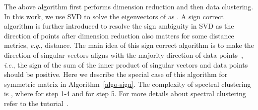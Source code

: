 \documentclass[sigconf]{acmart}
\newcommand{\ie}{\textit{i}.\textit{e}.}
\newcommand{\eg}{\textit{e}.\textit{g}.}
\begin{document}
The above algorithm first performs dimension reduction and then data clustering.
In this work, we use SVD to solve the eigenvectors of  as .
A sign correct algorithm is further introduced to resolve the sign
ambiguity in SVD as the direction of points after dimension
reduction also matters for some distance metrics, \eg,  distance.
The main idea of this sign correct algorithm is to make the 
direction of singular vectors aligns with
the majority direction of data points~\cite{signflip1},
\ie, the sign of the sum of the inner product of singular vectors
and data points should be positive.
Here we describe the special case of this algorithm for
symmetric matrix in Algorithm~\ref{algo-sign}.
The complexity of spectral clustering is , where 
for step 1-4 and  for step 5.
For more details about spectral clustering refer to the tutorial~\cite{von2007tutorial}.
\end{document}
